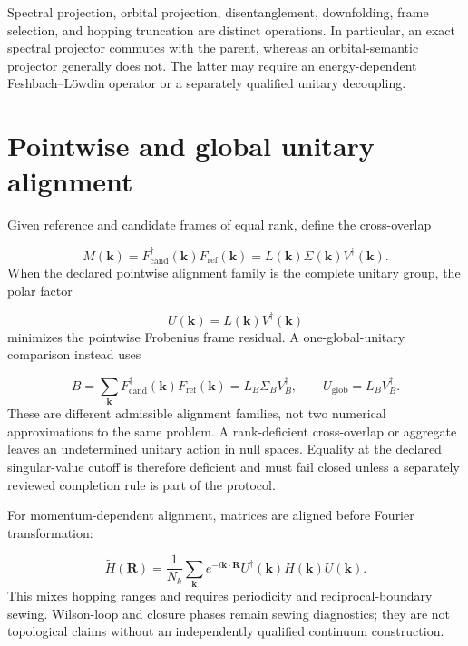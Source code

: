 \documentclass[11pt]{article}
\begin{document}
Spectral projection, orbital projection, disentanglement, downfolding, frame selection, and hopping truncation are distinct operations. In particular, an exact spectral projector commutes with the parent, whereas an orbital-semantic projector generally does not. The latter may require an energy-dependent Feshbach--Löwdin operator or a separately qualified unitary decoupling.

\section{Pointwise and global unitary alignment}
Given reference and candidate frames of equal rank, define the cross-overlap

\begin{equation}
M(\mathbf k)=F_{\mathrm{cand}}^\dagger(\mathbf k)F_{\mathrm{ref}}(\mathbf k)
=L(\mathbf k)\Sigma(\mathbf k)V^\dagger(\mathbf k).
\end{equation}
When the declared pointwise alignment family is the complete unitary group, the polar factor

\begin{equation}
U(\mathbf k)=L(\mathbf k)V^\dagger(\mathbf k)
\end{equation}
minimizes the pointwise Frobenius frame residual. A one-global-unitary comparison instead uses

\begin{equation}
B=\sum_{\mathbf k}F_{\mathrm{cand}}^\dagger(\mathbf k)
F_{\mathrm{ref}}(\mathbf k)=L_B\Sigma_BV_B^\dagger,
\qquad U_{\mathrm{glob}}=L_BV_B^\dagger.
\end{equation}
These are different admissible alignment families, not two numerical approximations to the same problem. A rank-deficient cross-overlap or aggregate leaves an undetermined unitary action in null spaces. Equality at the declared singular-value cutoff is therefore deficient and must fail closed unless a separately reviewed completion rule is part of the protocol.

For momentum-dependent alignment, matrices are aligned before Fourier transformation:

\begin{equation}
\widetilde H(\mathbf R)
=\frac{1}{N_k}\sum_{\mathbf k}e^{-i\mathbf k\cdot\mathbf R}
U^\dagger(\mathbf k)H(\mathbf k)U(\mathbf k).
\end{equation}
This mixes hopping ranges and requires periodicity and reciprocal-boundary sewing. Wilson-loop and closure phases remain sewing diagnostics; they are not topological claims without an independently qualified continuum construction.
\end{document}
